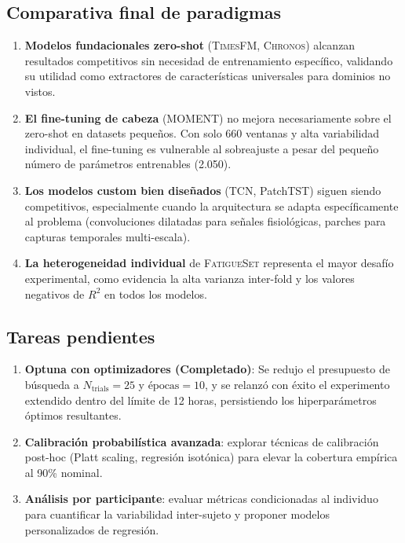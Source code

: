 \documentclass[12pt, a4paper]{article}
\newcommand{\fatigueset}{\textsc{FatigueSet}}
\newcommand{\moment}{\textsc{MOMENT}}
\newcommand{\chronos}{\textsc{Chronos}}
\newcommand{\timesfm}{\textsc{TimesFM}}
\begin{document}
\subsection{Comparativa final de paradigmas}

\begin{enumerate}
    \item \textbf{Modelos fundacionales zero-shot} (\timesfm{}, \chronos{}) alcanzan resultados competitivos sin necesidad de entrenamiento específico, validando su utilidad como extractores de características universales para dominios no vistos.

    \item \textbf{El fine-tuning de cabeza} (\moment{}) no mejora necesariamente sobre el zero-shot en datasets pequeños. Con solo 660 ventanas y alta variabilidad individual, el fine-tuning es vulnerable al sobreajuste a pesar del pequeño número de parámetros entrenables (2.050).

    \item \textbf{Los modelos custom bien diseñados} (TCN, PatchTST) siguen siendo competitivos, especialmente cuando la arquitectura se adapta específicamente al problema (convoluciones dilatadas para señales fisiológicas, parches para capturas temporales multi-escala).

    \item \textbf{La heterogeneidad individual} de \fatigueset{} representa el mayor desafío experimental, como evidencia la alta varianza inter-fold y los valores negativos de $R^2$ en todos los modelos.
\end{enumerate}

\subsection{Tareas pendientes}

\begin{enumerate}
    \item \textbf{Optuna con optimizadores (Completado)}: Se redujo el presupuesto de búsqueda a $N_{\text{trials}} = 25$ y $\text{épocas} = 10$, y se relanzó con éxito el experimento extendido dentro del límite de 12 horas, persistiendo los hiperparámetros óptimos resultantes.
    \item \textbf{Calibración probabilística avanzada}: explorar técnicas de calibración post-hoc (Platt scaling, regresión isotónica) para elevar la cobertura empírica al 90\% nominal.
    \item \textbf{Análisis por participante}: evaluar métricas condicionadas al individuo para cuantificar la variabilidad inter-sujeto y proponer modelos personalizados de regresión.
\end{enumerate}
\end{document}
